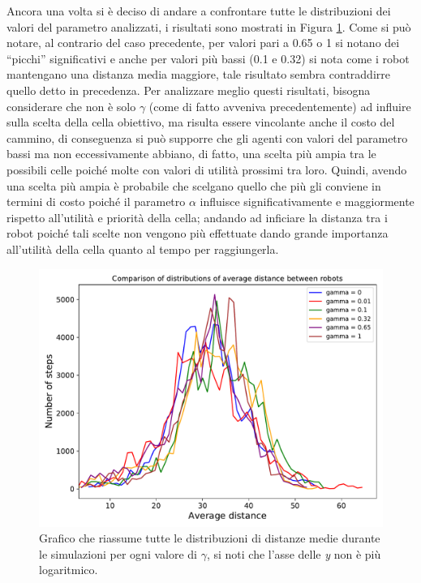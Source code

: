 Ancora una volta si è deciso di andare a confrontare tutte le distribuzioni dei valori del parametro analizzati, i risultati sono mostrati in Figura \ref{fig:gammaHComparison}.
Come si può notare, al contrario del caso precedente, per valori pari a 0.65 o 1 si notano dei “picchi” significativi e anche per valori più bassi (0.1 e 0.32) si nota come i robot mantengano una distanza media maggiore, tale risultato sembra contraddirre quello detto in precedenza.
Per analizzare meglio questi risultati, bisogna considerare che non è solo $\gamma$ (come di fatto avveniva precedentemente) ad influire sulla scelta della cella obiettivo, ma risulta essere vincolante anche il costo del cammino, di conseguenza si può supporre che gli agenti con valori del parametro bassi ma non eccessivamente abbiano, di fatto, una scelta più ampia tra le possibili celle poiché molte con valori di utilità prossimi tra loro.
Quindi, avendo una scelta più ampia è probabile che scelgano quello che più gli conviene in termini di costo poiché il parametro $\alpha$ influisce significativamente e maggiormente rispetto all'utilità e priorità della cella; andando ad inficiare la distanza tra i robot poiché tali scelte non vengono più effettuate dando grande importanza all'utilità della cella quanto al tempo per raggiungerla.
\begin{figure}
	\centering
	\includegraphics[width=0.9\linewidth]{images/gamma_results/high_alpha/comparison}
	\caption{Grafico che riassume tutte le distribuzioni di distanze medie durante le simulazioni per ogni valore di $\gamma$, si noti che l'asse delle \textit{y} non è più logaritmico.}
	\label{fig:gammaHComparison}
\end{figure}
